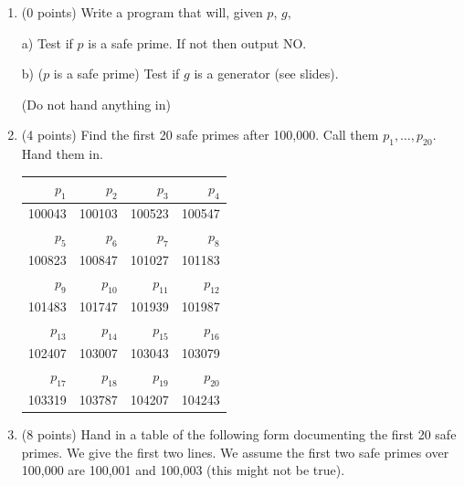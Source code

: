 \documentclass[12pt]{article}
\begin{document}
\begin{enumerate}
\begin{enumerate}
\vfill

\centerline{\bf GO TO NEXT PAGE FOR THE REST OF THIS PROBLEM}

\newpage

\item 
(0 points) Write a program that will, given $p$, $g$, 

a) Test if $p$ is a safe prime. If not then output NO.

b) ($p$ is a safe prime) Test if $g$ is a generator (see slides). 

(Do not hand anything in)


\item 
(4 points) 
Find the first 20 safe primes after 100,000. Call them $p_1,\ldots,p_{20}$. 
Hand them in.
\begin{table}[h!]
\centering
\begin{tabular}{|r|r|r|r|}
\hline
$p_1$ & $p_2$ & $p_3$ & $p_4$ \\
\hline
100043 & 100103 & 100523 & 100547 \\
\hline
$p_5$ & $p_6$ & $p_7$ & $p_8$ \\
\hline
100823 & 100847 & 101027 & 101183 \\
\hline
$p_9$ & $p_{10}$ & $p_{11}$ & $p_{12}$ \\
\hline
101483 & 101747 & 101939 & 101987 \\
\hline
$p_{13}$ & $p_{14}$ & $p_{15}$ & $p_{16}$ \\
\hline
102407 & 103007 & 103043 & 103079 \\
\hline
$p_{17}$ & $p_{18}$ & $p_{19}$ & $p_{20}$ \\
\hline
103319 & 103787 & 104207 & 104243 \\
\hline
\end{tabular}
\end{table}

\item
(8 points) 
Hand in a table of the following form documenting the first 20 safe primes.
We give the first two lines.
We assume the first two safe primes over 100,000 are 100,001 and 100,003
(this might not be true).


\end{enumerate}
\end{enumerate}
\end{document}
